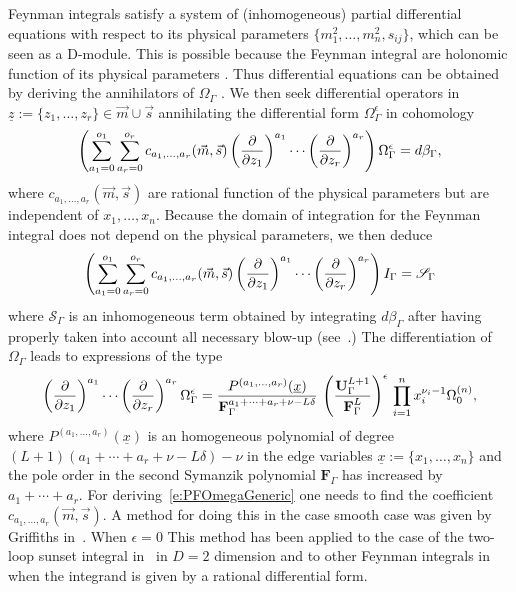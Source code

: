 \documentclass[a4paper,12pt]{article}
\newcommand\lNote[1]{
	\todo[backgroundcolor=red!20!white,fancyline,
	bordercolor=white]{ LDLC:  #1}}
\numberwithin{equation}{section}
\numberwithin{figure}{section}
\begin{document}
Feynman integrals satisfy a system of  (inhomogeneous) partial
differential equations with respect to its physical parameters
$ \{m_1^2,\dots,m_n^2,s_{ij}\}$, which can be seen as a D-module. This is possible
because the Feynman integral are holonomic function of its physical parameters \cite{Kashiwara:1977nf}.  Thus differential equations can be obtained by deriving the annihilators  of  $\Omega_\Gamma$ \lNote{$\epsilon$?}.
We then seek differential operators in $\underline
z:=\{z_1,\dots,z_r\} \in \vec m \cup \vec s$
annihilating the differential form $\Omega_\Gamma^\epsilon$ in cohomology
\begin{equation}\label{e:PFOmegaGeneric}
\left(  \sum_{a_1=0}^{o_1} \sum_{ a_r=0}^{o_r}  c_{a_1,\dots, a_r}(\vec m,\vec s) \left(\partial\over \partial z_1\right)^{a_1}\cdots\left(\partial
  \over\partial z_r\right)^{a_r}  \right)\Omega_\Gamma^\epsilon=d\beta_\Gamma,
\end{equation}
where $  c_{a_1,\dots, a_r}(\vec m,\vec s)$ are rational function of the physical
parameters but are independent of $x_1,\dots,x_n$.  
Because the domain of integration for the Feynman integral does not
depend on the physical parameters, we then deduce
\begin{equation}\label{e:PDEintFeynman}
  \left( \sum_{a_1=0}^{o_1} \sum_{ a_r=0}^{o_r}  c_{a_1,\dots, a_r}(\vec m,\vec s) \left(\partial\over \partial z_1\right)^{a_1}\cdots\left(\partial
  \over\partial z_r\right)^{a_r}  \right)I_\Gamma=\mathscr{S}_\Gamma
\end{equation}
where $\mathscr{S}_\Gamma$ is an inhomogeneous term obtained by
integrating $d\beta_\Gamma$ after having properly taken into account
all necessary blow-up (see~\cite{bek,Brown:2009ta,Bloch:2016izu,muller2014picard}.) The    differentiation of $\Omega_\Gamma$ 
leads  to  expressions of the type
\begin{equation}\label{e:PDE}
\left(\partial\over \partial z_1\right)^{a_1}\cdots\left(\partial
  \over\partial z_r\right)^{a_r} \Omega_\Gamma^\epsilon=
{  P^{(a_1,\dots,a_r)}(\underline x)\over \textbf{F}_\Gamma^{a_1+\cdots +a_r+\nu-L\delta}}\,
  \left(\textbf{U}_\Gamma^{L+1}\over \textbf{F}_\Gamma^L\right)^{\epsilon} \, \prod_{i=1}^n x_i^{\nu_i-1} \Omega^{(n)}_0  ,
\end{equation}
where $  P^{(a_1,\dots,a_r)}(\underline x)$ is an
  homogeneous polynomial of degree $(L+1)(a_1+\cdots+a_r+\nu-L\delta)-\nu$ in
 the edge variables $\underline x:=\{x_1,\dots, x_n\}$ and the
  pole order in the second Symanzik polynomial $\textbf{F}_\Gamma$ has increased by
  $a_1+\cdots+a_r$.
  For deriving~\eqref{e:PFOmegaGeneric} one needs to find the
  coefficient $c_{a_1,\dots,a_r}(\vec m,\vec s)$.  A method for doing this in the
  case smooth case was given by Griffiths in~\cite{Griffiths_1969,Dwork_1962,Dwork_1964}.
When $\epsilon=0$ 
This method has been applied to the case of the two-loop sunset
integral in~\cite{Bloch:2016izu} in $D=2$ dimension and to other Feynman
integrals in~\cite{Lairez:2022zkj}  when the integrand is given by a rational
differential form.
  
\end{document}
